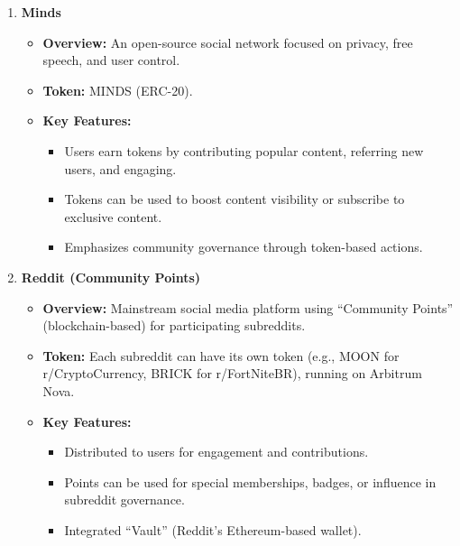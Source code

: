 \documentclass{article}
\begin{document}
\begin{itemize}
\begin{enumerate}
        \item \textbf{Minds}
          \begin{itemize}
            \item \textbf{Overview:} An open-source social network focused on privacy, free speech, and user control.
            \item \textbf{Token:} MINDS (ERC-20).
            \item \textbf{Key Features:}
              \begin{itemize}
                \item Users earn tokens by contributing popular content, referring new users, and engaging.
                \item Tokens can be used to boost content visibility or subscribe to exclusive content.
                \item Emphasizes community governance through token-based actions.
              \end{itemize}
          \end{itemize}

        \item \textbf{Reddit (Community Points)}
          \begin{itemize}
            \item \textbf{Overview:} Mainstream social media platform using ``Community Points'' (blockchain-based) for participating subreddits.
            \item \textbf{Token:} Each subreddit can have its own token (e.g., MOON for r/CryptoCurrency, BRICK for r/FortNiteBR), running on Arbitrum Nova.
            \item \textbf{Key Features:}
              \begin{itemize}
                \item Distributed to users for engagement and contributions.
                \item Points can be used for special memberships, badges, or influence in subreddit governance.
                \item Integrated ``Vault'' (Reddit’s Ethereum-based wallet).
              \end{itemize}
          \end{itemize}


\end{enumerate}
\end{itemize}
\end{document}
